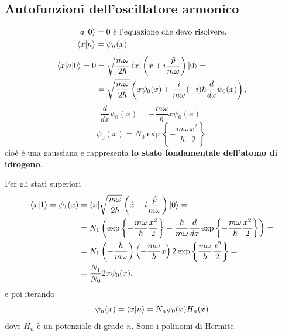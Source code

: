 \subsection{Autofunzioni dell'oscillatore armonico}
\begin{align*}
a \ket{0} &= 0 \text{ è l'equazione che devo risolvere.} \\
\braket{x|n} &= \psi_n(x)
\end{align*}
\begin{align*}
\braket{x|a|0} = 0 &= \sqrt{\frac{m\omega}{2\hbar}} \braket{x|\left( \hat{x} + i\frac{\hat{p}}{m\omega} \right)|0} = \\
&= \sqrt{\frac{m\omega}{2\hbar}} \left( x \psi_0(x) + \frac{i}{m\omega} (-i) \hbar \frac{d}{dx}\psi_0(x) \right),
\end{align*}
\[
\frac{d}{dx} \psi_0(x) = -\frac{m\omega}{\hbar} x \psi_0(x),
\]
\[
\psi_0(x) = N_0 \exp \left\{ -\frac{m\omega}{\hbar} \frac{x^2}{2} \right\}.
\]
cioè è una gaussiana e rappresenta \textbf{lo stato fondamentale dell'atomo di idrogeno}.

\bigskip
\noindent
Per gli stati superiori
\begin{align*}
\braket{x|1} = \psi_1(x) &= \braket{x|\sqrt{\frac{m\omega}{2\hbar}} \left( \hat{x} - i \frac{\hat{p}}{m\omega} \right)|0} = \\
&= N_1 \left( \exp \left\{ -\frac{m\omega}{\hbar} \frac{x^2}{2} \right\} - \frac{\hbar}{m\omega} \frac{d}{dx} \exp \left\{ -\frac{m\omega}{\hbar} \frac{x^2}{2} \right\} \right) = \\
&= N_1 \left( -\frac{\hbar}{m\omega} \right) \left( -\frac{m\omega}{\hbar} x \right) 2 \exp \left\{ \frac{m\omega}{\hbar} \frac{x^2}{2} \right\} = \\
&= \frac{N_1}{N_0} 2 x \psi_0(x).
\end{align*}
e poi iterando
\[
\psi_n(x) = \braket{x|n} = N_n \psi_0(x) H_n(x)
\]
dove \( H_n \) è un potenziale di grado \( n \). Sono i polinomi di Hermite.